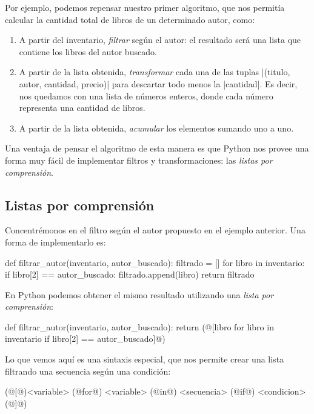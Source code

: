 \begin{subappendices}

Por ejemplo, podemos repensar nuestro primer algoritmo, que nos permitía calcular
la cantidad total de libros de un determinado autor, como:

\begin{enumerate}
    \item A partir del inventario, \emph{filtrar} según el autor:
        el resultado será una lista que contiene los libros del autor buscado.
    \item A partir de la lista obtenida, \emph{transformar} cada una de las tuplas
        |(titulo, autor, cantidad, precio)| para descartar todo menos la
        |cantidad|. Es decir, nos quedamos con una lista de números
        enteros, donde cada número representa una cantidad de libros.
    \item A partir de la lista obtenida, \emph{acumular} los elementos sumando uno
        a uno.
\end{enumerate}

Una ventaja de pensar el algoritmo de esta manera es que Python nos provee una
forma muy fácil de implementar filtros y transformaciones: las \emph{listas por
comprensión}.

\subsection{Listas por comprensión}

Concentrémonos en el filtro según el autor propuesto en el ejemplo anterior.
Una forma de implementarlo es:

\begin{codigo-python-sn}
def filtrar_autor(inventario, autor_buscado):
    filtrado = []
    for libro in inventario:
        if libro[2] == autor_buscado:
            filtrado.append(libro)
    return filtrado
\end{codigo-python-sn}

En Python podemos obtener el mismo resultado utilizando una \emph{lista por
comprensión}:

\begin{codigo-python-sn}
def filtrar_autor(inventario, autor_buscado):
    return (@[libro for libro in inventario if libro[2] == autor_buscado]@)
\end{codigo-python-sn}

Lo que vemos aquí es una sintaxis especial, que nos permite crear una lista
filtrando una secuencia según una condición:

\begin{codigo-python-sn}
(@[@)<variable> (@for@) <variable> (@in@) <secuencia> (@if@) <condicion>(@]@)
\end{codigo-python-sn}


\end{subappendices}
